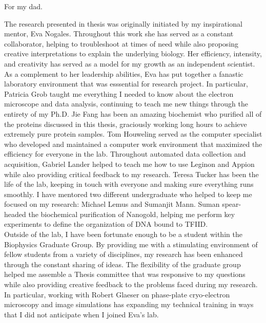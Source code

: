 \documentclass{ucbthesis}
\begin{document}
\begin{frontmatter}

\begin{dedication}
\null\vfil
\begin{center}
For my dad.
\end{center}
\vfil\null
\end{dedication}

\tableofcontents
\clearpage
\listoffigures
\clearpage


\begin{acknowledgements}
The research presented in thesis was originally initiated by my inspirational mentor, Eva Nogales. Throughout this work she has served as a constant collaborator, helping to troubleshoot at times of need while also proposing creative interpretations to explain the underlying biology. Her efficiency, intensity, and creativity has served as a model for my growth as an independent scientist.\\
\indent As a complement to her leadership abilities, Eva has put together a fanastic laboratory environment that was esssential for research project. In particular, Patricia Grob taught me everything I needed to know about the electron microscope and data analysis, continuing to teach me new things through the entirety of my Ph.D. Jie Fang has been an amazing biochemist who purified all of the proteins discussed in this thesis, graciously working long hours to achieve extremely pure protein samples. Tom Houweling served as the computer specialist who developed and maintained a computer work environment that maximized the efficiency for everyone in the lab. Throughout automated data collection and acquisition, Gabriel Lander helped to teach me how to use Leginon and Appion while also providing critical feedback to my research. Teresa Tucker has been the life of the lab, keeping in touch with everyone and making sure everything runs smoothly. I have mentored two different undergraduate who helped to keep me focused on my research: Michael Lemus and Sumanjit Mann. Suman spear-headed the biochemical purification of Nanogold, helping me perform key experiments to define the organization of DNA bound to TFIID.\\
\indent Outside of the lab, I have been fortunate enough to be a student within the Biophysics Graduate Group. By providing me with a stimulating environment of fellow students from a variety of disciplines, my research has been enhanced through the constant sharing of ideas. The flexibility of the graduate group helped me assemble a Thesis committee that was responsive to my questions while also providing creative feedback to the problems faced during my research. In particular, working with Robert Glaeser on phase-plate cryo-electron microscopy and image simulations has expanding my technical training in ways that I did not anticipate when I joined Eva's lab.\\

\end{acknowledgements}
\end{frontmatter}
\end{document}
